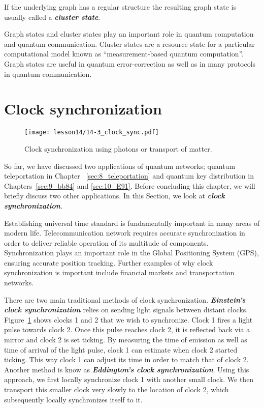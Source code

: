 If the underlying graph has a regular structure the resulting graph state is usually called a \textbf{\textit{cluster state}}.

Graph states and cluster states play an important role in quantum computation and quantum communication.
Cluster states are a resource state for a particular computational model known as ``measurement-based quantum computation''.
Graph states are useful in quantum error-correction as well as in many protocols in quantum communication.





\section{Clock synchronization}
\label{sec:14-3_clock_sync}

\begin{figure}[t]
    \centering
    \texttt{[image: lesson14/14-3\_clock\_sync.pdf]}
    \caption[Clock synchronization.]{Clock synchronization using photons or transport of matter.}
    \label{fig:14-3_clock_sync}
\end{figure}

So far, we have discussed two applications of quantum networks; quantum teleportation in Chapter ~\ref{sec:8_teleportation} and quantum key distribution in Chapters~\ref{sec:9_bb84} and \ref{sec:10_E91}.
Before concluding this chapter, we will briefly discuss two other applications.
In this Section, we look at \textbf{\textit{clock synchronization}}.

Establishing universal time standard is fundamentally important in many areas of modern life.
Telecommunication network requires accurate synchronization in order to deliver reliable operation of its multitude of components.
Synchronization plays an important role in the Global Positioning System (GPS), ensuring accurate position tracking.
Further examples of why clock synchronization is important include financial markets and transportation networks.

There are two main traditional methods of clock synchronization.
\textbf{\textit{Einstein's clock synchronization}} relies on sending light signals between distant clocks.
Figure~\ref{fig:14-3_clock_sync} shows clocks 1 and 2 that we wish to synchronize.
Clock 1 fires a light pulse towards clock 2.
Once this pulse reaches clock 2, it is reflected back via a mirror and clock 2 is set ticking.
By measuring the time of emission as well as time of arrival of the light pulse, clock 1 can estimate when clock 2 started ticking.
This way clock 1 can adjust its time in order to match that of clock 2.
Another method is know as \textbf{\textit{Eddington's clock synchronization}}.
Using this approach, we first locally synchronize clock 1 with another small clock.
We then transport this smaller clock very slowly to the location of clock 2, which subsequently locally synchronizes itself to it.

